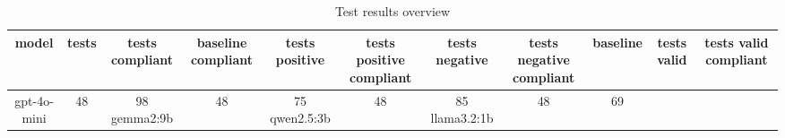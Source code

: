 
  \begin{table}[h!]
  \centering
  \begin{tabular}{|c|c|c|c|c|c|c|c|c|c|c|}
  \hline
  model & tests & tests compliant & baseline compliant & tests positive & tests positive compliant & tests negative & tests negative compliant & baseline & tests valid & tests valid compliant \\
  \hline
  gpt-4o-mini & 48 & 98%
\hline
gemma2:9b & 48 & 75%
\hline
qwen2.5:3b & 48 & 85%
\hline
llama3.2:1b & 48 & 69%
  \end{tabular}
  \caption{Test results overview}
  
  \end{table}
  